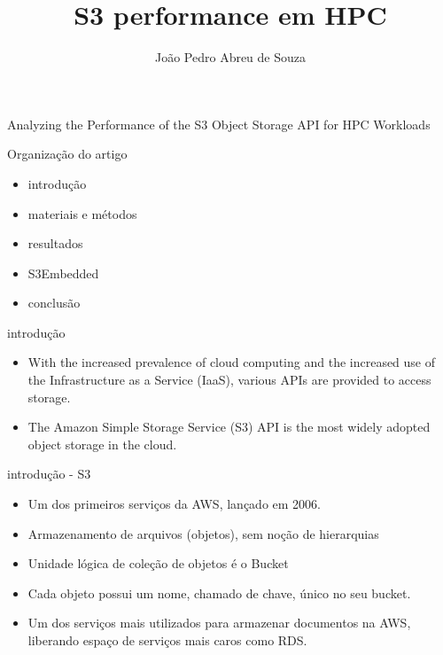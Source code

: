 \documentclass{beamer}
\title{S3 performance em HPC}
\author{João Pedro Abreu de Souza}
\begin{document}
\begin{frame}{Analyzing the Performance of the S3 Object Storage API for HPC Workloads}
\end{frame}
\begin{frame}{Organização do artigo}
 \begin{itemize}
     \item introdução
     \item materiais e métodos
     \item resultados
     \item S3Embedded
     \item conclusão
 \end{itemize}   
\end{frame}
\begin{frame}{introdução}
\begin{itemize}
    \item With the increased prevalence of cloud computing and the increased use of the Infrastructure as a Service (IaaS), various APIs are provided to access storage.
    \item The Amazon Simple Storage Service (S3) API is the most widely adopted object storage in the cloud.
\end{itemize}    
\end{frame}
\begin{frame}{introdução - S3}
	\begin{itemize}
		\item 	Um dos primeiros serviços da AWS, lançado em 2006.
		\pause
		\item	Armazenamento de arquivos (objetos), sem noção de hierarquias
		\pause
		\item	Unidade lógica de coleção de objetos é o Bucket
		\pause
		\item	Cada objeto possui um nome, chamado de chave, único no seu bucket.
		\pause
		\item	Um dos serviços mais utilizados para armazenar documentos na AWS, liberando espaço de serviços mais caros como RDS.
	\end{itemize}
\end{frame}
\end{document}
